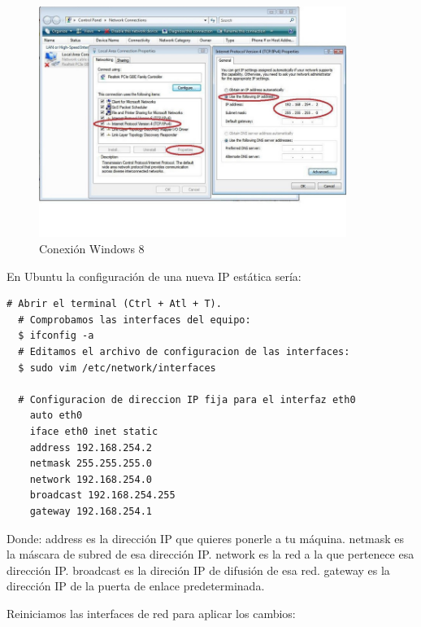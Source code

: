 \begin{enumerate}
\begin{figure} [hbtp]
\begin{center}
  \includegraphics[width=10cm]{img/cap3/3_4/conexion}
\end{center}
\caption{Conexión Windows 8}
\label{fig:w8}
\end{figure}

En Ubuntu la configuración de una nueva IP estática sería:

\renewcommand{\lstlistingname}{Configuración}
\begin{lstlisting}[caption= Ubuntu, label={lst:config_ubuntu}]
  # Abrir el terminal (Ctrl + Atl + T).
  # Comprobamos las interfaces del equipo:  
  $ ifconfig -a
  # Editamos el archivo de configuracion de las interfaces:  
  $ sudo vim /etc/network/interfaces

  # Configuracion de direccion IP fija para el interfaz eth0
    auto eth0
    iface eth0 inet static
    address 192.168.254.2
    netmask 255.255.255.0
    network 192.168.254.0
    broadcast 192.168.254.255
    gateway 192.168.254.1
\end{lstlisting}

  Donde:
    \subsubitem address es la dirección IP que quieres ponerle a tu máquina.
    \subsubitem netmask es la máscara de subred de esa dirección IP.
    \subsubitem network es la red a la que pertenece esa dirección IP.
    \subsubitem broadcast es la direción IP de difusión de esa red.
    \subsubitem gateway es la dirección IP de la puerta de enlace predeterminada.

\subitem Reiniciamos las interfaces de red para aplicar los cambios:


\end{enumerate}
